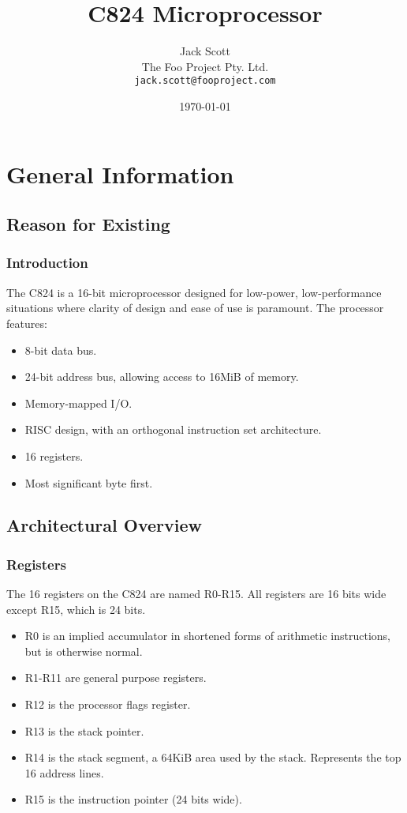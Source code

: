\documentclass[a4paper]{report}
\begin{document}
	
\title{C824 Microprocessor}
\author{Jack Scott\\
	The Foo Project Pty. Ltd.\\
	\texttt{jack.scott@fooproject.com}}
\date{\today}
\maketitle

\tableofcontents
	
\part{General Information}

\chapter{Reason for Existing}

\section{Introduction}

The C824 is a 16-bit microprocessor designed for low-power, low-performance situations where clarity of design and ease of use is paramount. The processor features:

\begin{itemize}
	\item 8-bit data bus.
	\item 24-bit address bus, allowing access to 16MiB of memory.
	\item Memory-mapped I/O.
	\item RISC design, with an orthogonal instruction set architecture.
	\item 16 registers.
	\item Most significant byte first.
\end{itemize}

\chapter{Architectural Overview}

\section{Registers}
The 16 registers on the C824 are named R0-R15. All registers are 16 bits wide except R15, which is 24 bits.
\begin{itemize}
	\item R0 is an implied accumulator in shortened forms of arithmetic instructions, but is otherwise normal.
	\item R1-R11 are general purpose registers.
	\item R12 is the processor flags register.
	\item R13 is the stack pointer.
	\item R14 is the stack segment, a 64KiB area used by the stack. Represents the top 16 address lines.
	\item R15 is the instruction pointer (24 bits wide).
\end{itemize}
\end{document}
